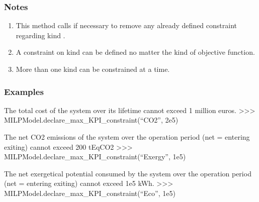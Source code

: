 \documentclass[letterpaper,10pt,english]{sphinxmanual}
\begin{document}
\begin{fulllineitems}
\begin{fulllineitems}
\begin{quote}
\begin{description}
\end{description}\end{quote}
\subsubsection*{Notes}
\begin{enumerate}
%
\item {} 
\sphinxAtStartPar
This method calls  if necessary to remove any already defined constraint
regarding kind .

\item {} 
\sphinxAtStartPar
A constraint on kind  can be defined no matter the kind of objective function.

\item {} 
\sphinxAtStartPar
More than one kind can be constrained at a time.

\end{enumerate}
\subsubsection*{Examples}

\begin{sphinxVerbatim}[commandchars=\\\{\}]
 
\end{sphinxVerbatim}

\sphinxAtStartPar
The total cost of the system over its lifetime cannot exceed 1 million euros.
\textgreater{}\textgreater{}\textgreater{} MILPModel.declare\_max\_KPI\_constraint(“CO2”, 2e5)

\sphinxAtStartPar
The net CO2 emissions of the system over the operation period (net = entering \sphinxhyphen{} exiting) cannot exceed 200 tEqCO2
\textgreater{}\textgreater{}\textgreater{} MILPModel.declare\_max\_KPI\_constraint(“Exergy”, 1e5)

\sphinxAtStartPar
The net exergetical potential consumed by the system over the operation period (net = entering \sphinxhyphen{} exiting) cannot exceed 1e5 kWh.
\textgreater{}\textgreater{}\textgreater{} MILPModel.declare\_max\_KPI\_constraint(“Eco”, \sphinxhyphen{}1e5)


\end{fulllineitems}
\end{fulllineitems}
\end{document}
